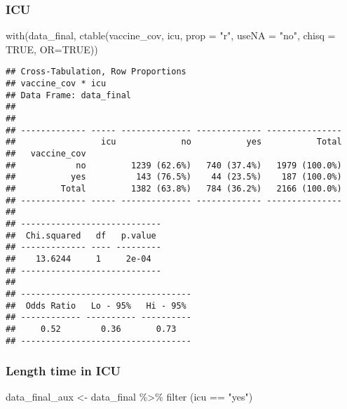 \documentclass[
]{article}
\newenvironment{Shaded}{\begin{snugshade}}{\end{snugshade}}
\newcommand{\AttributeTok}[1]{\textcolor[rgb]{0.77,0.63,0.00}{#1}}
\newcommand{\ConstantTok}[1]{\textcolor[rgb]{0.00,0.00,0.00}{#1}}
\newcommand{\FunctionTok}[1]{\textcolor[rgb]{0.00,0.00,0.00}{#1}}
\newcommand{\NormalTok}[1]{#1}
\newcommand{\OtherTok}[1]{\textcolor[rgb]{0.56,0.35,0.01}{#1}}
\newcommand{\SpecialCharTok}[1]{\textcolor[rgb]{0.00,0.00,0.00}{#1}}
\newcommand{\StringTok}[1]{\textcolor[rgb]{0.31,0.60,0.02}{#1}}
\begin{document}
\hypertarget{icu}{%
\subsubsection{ICU}\label{icu}}

\begin{Shaded}
\begin{Highlighting}[]
\FunctionTok{with}\NormalTok{(data\_final, }\FunctionTok{ctable}\NormalTok{(vaccine\_cov, icu, }\AttributeTok{prop =} \StringTok{"r"}\NormalTok{, }\AttributeTok{useNA =} \StringTok{"no"}\NormalTok{, }\AttributeTok{chisq =} \ConstantTok{TRUE}\NormalTok{, }\AttributeTok{OR=}\ConstantTok{TRUE}\NormalTok{))}
\end{Highlighting}
\end{Shaded}

\begin{verbatim}
## Cross-Tabulation, Row Proportions  
## vaccine_cov * icu  
## Data Frame: data_final  
## 
## 
## ------------- ----- -------------- ------------- ---------------
##                 icu             no           yes           Total
##   vaccine_cov                                                   
##            no         1239 (62.6%)   740 (37.4%)   1979 (100.0%)
##           yes          143 (76.5%)    44 (23.5%)    187 (100.0%)
##         Total         1382 (63.8%)   784 (36.2%)   2166 (100.0%)
## ------------- ----- -------------- ------------- ---------------
## 
## ----------------------------
##  Chi.squared   df   p.value 
## ------------- ---- ---------
##    13.6244     1     2e-04  
## ----------------------------
## 
## ----------------------------------
##  Odds Ratio   Lo - 95%   Hi - 95% 
## ------------ ---------- ----------
##     0.52        0.36       0.73   
## ----------------------------------
\end{verbatim}

\hypertarget{length-time-in-icu}{%
\subsubsection{Length time in ICU}\label{length-time-in-icu}}

\begin{Shaded}
\begin{Highlighting}[]
\NormalTok{data\_final\_aux }\OtherTok{\textless{}{-}}\NormalTok{ data\_final }\SpecialCharTok{\%\textgreater{}\%} 
  \FunctionTok{filter}\NormalTok{ (icu }\SpecialCharTok{==} \StringTok{"yes"}\NormalTok{)}
\end{Highlighting}
\end{Shaded}
\end{document}
